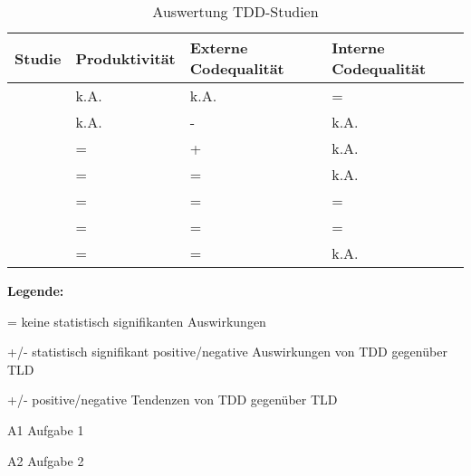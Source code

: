 \begin{table}[bth]
\renewcommand{\arraystretch}{1.3}
\caption{Auswertung TDD-Studien}
\label{table:TDDAuswertungStudien}
\centering
\begin{threeparttable}
\begin{tabularx}{\columnwidth}{@{}llll@{}}
\toprule
Studie & Produktivität & Externe Codequalität & Interne Codequalität \\ \midrule
\cite{Madeyski2010TheExperiment} & k.A. & k.A. & =\tnote{+} \\
\cite{Madeyski2005PreliminaryQuality} & k.A. & - & k.A. \\
\cite{Gupta2007AnDevelopment}\tnote{A1} & = & + & k.A. \\
\cite{Gupta2007AnDevelopment}\tnote{A2} & =\tnote{+} & =\tnote{-} & k.A. \\
\cite{Muller2002ExperimentProgramming} & = & =\tnote{+} & = \\
\cite{Causevic2012TestExperiment} & =\tnote{+} & =\tnote{+} & = \\
\cite{Fucci2016AnApproach} & = & = & k.A. \\ \bottomrule
\end{tabularx}
\medskip
      \footnotesize\textbf{Legende:}\smallskip
      \begin{tablenotes}\footnotesize
      \item = keine statistisch signifikanten Auswirkungen
      \item +/- statistisch signifikant positive/negative Auswirkungen von TDD gegenüber TLD
      \item[+/-] positive/negative Tendenzen von TDD gegenüber TLD
      \item[A1] Aufgabe 1
      \item[A2] Aufgabe 2
      \end{tablenotes}
\end{threeparttable}
\end{table}

